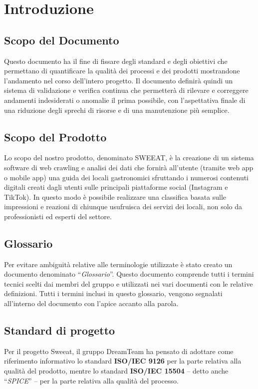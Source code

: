 \section{Introduzione}

\subsection{Scopo del Documento}
Questo documento ha il fine di fissare degli standard e degli obiettivi che permettano di quantificare la qualità dei processi e dei prodotti mostrandone l’andamento nel corso dell’intero progetto.
Il documento definirà quindi un sistema di validazione e verifica continua che permetterà di rilevare e correggere andamenti indesiderati o anomalie il prima possibile, con l'aspettativa finale di una riduzione degli sprechi di risorse e di una manutenzione più semplice.

\subsection{Scopo del Prodotto}

Lo scopo del nostro prodotto, denominato SWEEAT, è la creazione di un sistema software di web crawling e analisi dei dati che fornirà all'utente (tramite web app o mobile app) una guida dei locali gastronomici sfruttando i numerosi contenuti digitali creati dagli utenti sulle principali piattaforme social (Instagram e TikTok). In questo modo è possibile realizzare una classifica basata sulle impressioni e reazioni di chiunque usufruisca dei servizi dei locali, non solo da professionisti ed esperti del settore.

\subsection{Glossario}

Per evitare ambiguità relative alle terminologie utilizzate è stato creato un documento denominato “\textit{Glossario}”. Questo documento comprende tutti i termini tecnici scelti dai membri del gruppo e utilizzati nei vari documenti con le relative definizioni. Tutti i termini inclusi in questo glossario, vengono segnalati all’interno del documento con l’apice \glo{} accanto alla parola.

\subsection{Standard di progetto}
Per il progetto Sweeat, il gruppo DreamTeam ha pensato di adottare come riferimento informativo lo standard \textbf{ISO/IEC 9126} per la parte relativa alla qualità del prodotto, mentre lo standard \textbf{ISO/IEC 15504} – detto anche “\textit{SPICE}” – per la parte relativa alla qualità del processo.
